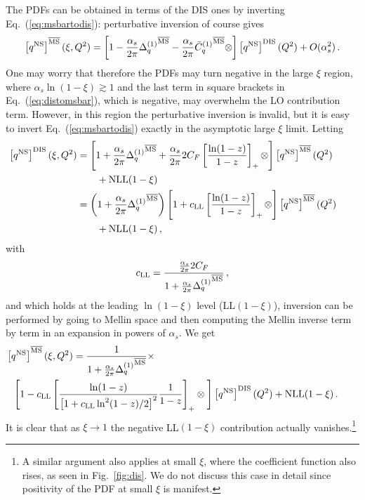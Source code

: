 The \msbar{} PDFs can be obtained in terms of the DIS ones by inverting
Eq.~(\ref{eq:msbartodis}): perturbative inversion of course gives
\begin{equation}\label{eq:distomsbar}
\left[{q^{{\textrm{NS}}}}\right]^{{\overline{\textrm{{MS}}}}}(\xi,Q^2)=
\left[1-\frac{\alpha_s}{2\pi} {\Delta^{(1)}_q}^{{\overline{\textrm{{MS}}}}}
  -\frac{\alpha_s}{2\pi}  {\bar
    C^{(1)}_q{}}^{{\overline{\textrm{{MS}}}}}\otimes\right]\left[{q^{{\textrm{NS}}}}\right]^{\textrm{DIS}}(Q^2)
+O(\alpha_s^2) \,.
\end{equation}
One may worry that therefore the \msbar{} PDFs may turn negative in the
large $\xi$ region, where $\alpha_s\ln(1-\xi)\gtrsim 1$ and the last term
in square brackets in Eq.~(\ref{eq:distomsbar}), which is negative, may overwhelm the LO
contribution 
term. However, in this region the perturbative
inversion is invalid, but it is easy to invert
Eq.~(\ref{eq:msbartodis}) exactly in the asymptotic large $\xi$ limit.
Letting
\begin{align}\label{eq:msbartodisp}
    \hspace{-20pt}\left[{q^{\NS}}\right]^{\textrm{DIS}}(\xi,Q^2)&=
\left[1+\frac{\alpha_s}{2\pi} {\Delta^{(1)}_q}^{\mmsbar}
  +\frac{\alpha_s}{2\pi} 2C_F\left[\frac{\ln(1-z)}{1-z}\right]_+
  \otimes\right]\left[{q^{\NS}}\right]^{\mmsbar}(Q^2)\nonumber\\
    &\qquad+ \hbox{NLL}(1-\xi)\\
\label{eq:msbartodisp1}
    &= \left(1+\frac{\alpha_s}{2\pi} {\Delta^{(1)}_q}^{\mmsbar}\right) 
\left[1+c_{\textrm{LL}}\left[\frac{\ln(1-z)}{1-z}\right]_+
\otimes\right]\left[{q^{\NS}}\right]^{\mmsbar}(Q^2)\nonumber\\
    &\qquad+ \hbox{NLL}(1-\xi) \,,
\end{align}
with
\begin{equation}
    \label{eq:msbartodiscoeff}
    c_{\textrm{LL}} = \frac{\frac{\alpha_s}{2\pi} 2C_F}{1+\frac{\alpha_s}{2\pi} {\Delta^{(1)}_q}^{{\overline{\textrm{{MS}}}}}} \,, 
\end{equation}
and which holds at the leading $\ln(1-\xi)$ level (LL$(1-\xi)$),
inversion can be performed by going to Mellin space and then computing
the Mellin inverse term by term in an expansion in powers of $\alpha_s$.
We get
\begin{align}\label{eq:distomsbarllx}
    \hspace*{-20pt} \left[{q^{\NS}}\right]^{\mmsbar}(\xi,Q^2) &= \frac{1}{1+\frac{\alpha_s}{2\pi} {\Delta^{(1)}_q}^{\mmsbar}} \times \nonumber\\
    &\hspace*{-60pt}\Bigg[1 -c_{\textrm{LL}} \left[ \frac{\ln(1-z)}{\left[1+c_{\textrm{LL}}\ln^2(1-z)/2\right]^2}  \frac{1}{1-z}\right]_+
\otimes\Bigg]\left[{q^{\NS}}\right]^{\textrm{DIS}}(Q^2) + \hbox{NLL}(1-\xi) \,.
\end{align}
It is clear that as $\xi\to 1$ the negative LL$(1-\xi)$ contribution
actually vanishes.\footnote{A similar argument also applies at small
  $\xi$, where the coefficient function also rises, as seen in
  Fig.~\ref{fig:dis}. We do not discuss this case in detail since
  positivity of the \msbar{} PDF at small $\xi$ is manifest.}




